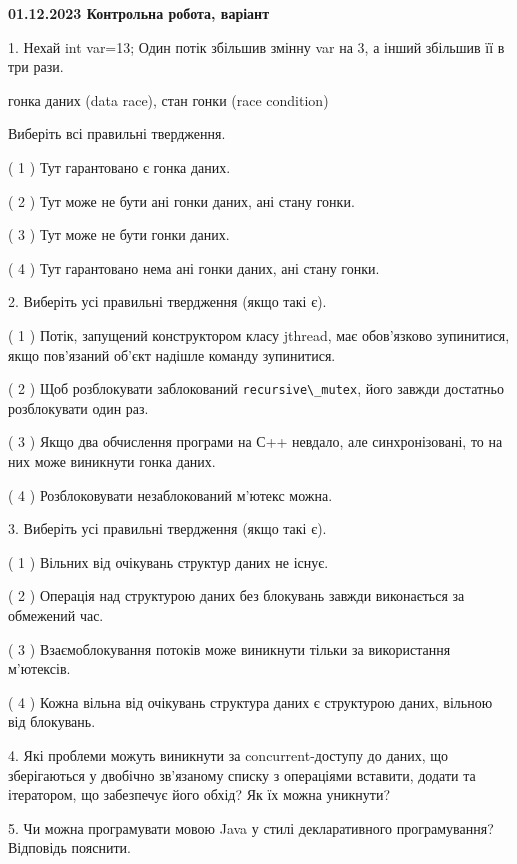 \documentclass[12pt, ukrainian]{article}
\def\code#1{\Verb!#1!}
\begin{document}
\vspace{4mm}
\newpage
\begin {large}

\textbf{01.12.2023 Контрольна робота, варіант  }\par


{
1. Нехай int var=13; Один потік збільшив змінну var на 3, а інший збільшив її в три рази.

гонка даних (data race), стан гонки (race condition)

Виберіть всі правильні твердження.\par
\vspace{2mm}
( 1 ) Тут гарантовано є гонка даних.%

( 2 ) Тут може не бути ані гонки даних, ані стану гонки.%

( 3 ) Тут може не бути гонки даних.%

( 4 ) Тут гарантовано нема ані гонки даних, ані стану гонки.%


\vspace{5mm}
2. Виберіть усі правильні твердження (якщо такі є).\par
\vspace{2mm}

( 1 ) Потік, запущений конструктором класу jthread, має обов’язково зупинитися, якщо пов’язаний об’єкт надішле команду зупинитися.%

( 2 ) Щоб розблокувати заблокований \code{recursive\_mutex}, його завжди достатньо розблокувати один раз.%

( 3 ) Якщо два обчислення програми на С++ невдало, але синхронізовані, то на них може виникнути гонка даних.%

( 4 ) Розблоковувати незаблокований м’ютекс можна.%


\vspace{5mm}
3. Виберіть усі правильні твердження (якщо такі є).\par
\vspace{2mm}

( 1 ) Вільних від очікувань структур даних не існує.%

( 2 ) Операція над структурою даних без блокувань завжди виконається за обмежений час.%

( 3 ) Взаємоблокування потоків може виникнути тільки за використання м’ютексів.%

( 4 ) Кожна вільна від очікувань структура даних є структурою даних, вільною від блокувань.%


\vspace{5mm}
4. Які проблеми можуть виникнути за concurrent-доступу до даних, що зберігаються у двобічно зв’язаному списку з операціями вставити, додати та ітератором, що забезпечує його обхід? Як їх можна уникнути?



\vspace{5mm}
5. Чи можна програмувати мовою Java у стилі декларативного програмування? Відповідь пояснити.
}
\end {large}
\end{document}
